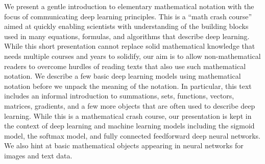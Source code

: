 We present a gentle introduction to elementary mathematical notation with the focus of communicating deep learning principles. This is a ``math crash course'' aimed at quickly enabling scientists with understanding of  the building blocks used in many equations, formulas, and algorithms that describe deep learning. While this short presentation cannot replace solid mathematical knowledge that needs multiple courses and years to solidify, our aim is to allow non-mathematical readers to overcome hurdles of reading texts that also use such mathematical notation. We describe a few basic deep learning models using mathematical notation before we unpack the meaning of the notation. In particular, this text includes an informal introduction to summations, sets, functions, vectors, matrices, gradients, and a few more objects that are often used to describe deep learning. While this is a mathematical crash course, our presentation is kept in the context of deep learning and machine learning models including the sigmoid model, the softmax model, and fully connected feedforward deep neural networks. We also hint at basic mathematical objects appearing in neural networks for images and text data.
